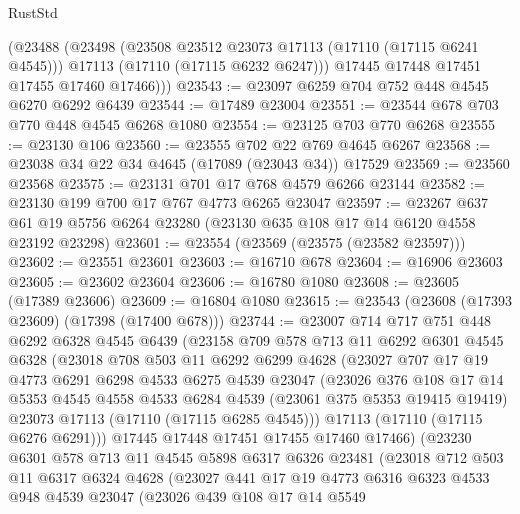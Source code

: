 \begin{lexlean}{RustStd}
\begin{coremodule}
        (@23488
          (@23498
            (@23508 @23512 @23073 @17113 (@17110 (@17115 @6241 @4545)))
            @17113
            (@17110 (@17115 @6232 @6247)))
          @17445
          @17448
          @17451
          @17455
          @17460
          @17466)))
@23543 := @23097 @6259 @704 @752 @448 @4545 @6270 @6292 @6439
@23544 := @17489 @23004
@23551 := @23544 @678 @703 @770 @448 @4545 @6268 @1080
@23554 := @23125 @703 @770 @6268
@23555 := @23130 @106
@23560 := @23555 @702 @22 @769 @4645 @6267
@23568 := @23038 @34 @22 @34 @4645 (@17089 (@23043 @34)) @17529
@23569 := @23560 @23568
@23575 := @23131 @701 @17 @768 @4579 @6266 @23144
@23582 := @23130 @199 @700 @17 @767 @4773 @6265 @23047
@23597 := @23267
    @637
    @61
    @19
    @5756
    @6264
    @23280
    (@23130 @635 @108 @17 @14 @6120 @4558 @23192 @23298)
@23601 := @23554 (@23569 (@23575 (@23582 @23597)))
@23602 := @23551 @23601
@23603 := @16710 @678
@23604 := @16906 @23603
@23605 := @23602 @23604
@23606 := @16780 @1080
@23608 := @23605 (@17389 @23606)
@23609 := @16804 @1080
@23615 := @23543 (@23608 (@17393 @23609) (@17398 (@17400 @678)))
@23744 := @23007
    @714
    @717
    @751
    @448
    @6292
    @6328
    @4545
    @6439
    (@23158
      @709
      @578
      @713
      @11
      @6292
      @6301
      @4545
      @6328
      (@23018
        @708
        @503
        @11
        @6292
        @6299
        @4628
        (@23027
          @707
          @17
          @19
          @4773
          @6291
          @6298
          @4533
          @6275
          @4539
          @23047
          (@23026
            @376
            @108
            @17
            @14
            @5353
            @4545
            @4558
            @4533
            @6284
            @4539
            (@23061 @375 @5353 @19415 @19419)
            @23073
            @17113
            (@17110 (@17115 @6285 @4545)))
          @17113
          (@17110 (@17115 @6276 @6291)))
        @17445
        @17448
        @17451
        @17455
        @17460
        @17466)
      (@23230
        @6301
        @578
        @713
        @11
        @4545
        @5898
        @6317
        @6326
        @23481
        (@23018
          @712
          @503
          @11
          @6317
          @6324
          @4628
          (@23027
            @441
            @17
            @19
            @4773
            @6316
            @6323
            @4533
            @948
            @4539
            @23047
            (@23026
              @439
              @108
              @17
              @14
              @5549

\end{coremodule}
\end{lexlean}
